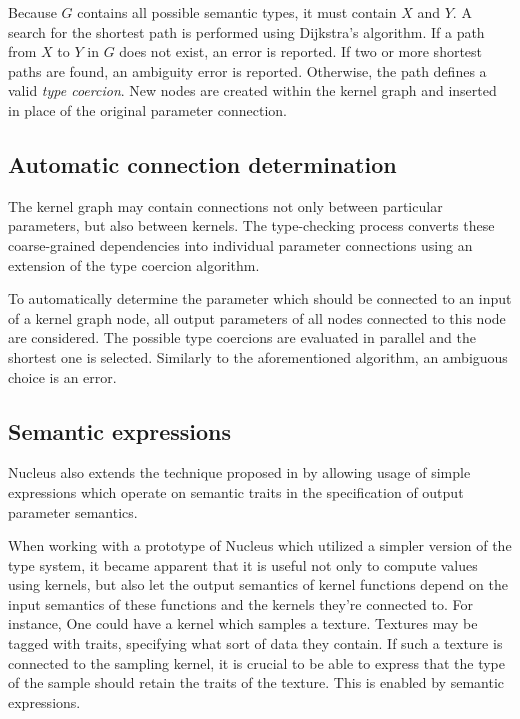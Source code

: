 Because $G$ contains all possible semantic types, it must contain $X$ and $Y$. A search for the shortest path is performed using Dijkstra's algorithm. If a path from $X$ to $Y$ in $G$ does not exist, an error is reported. If two or more shortest paths are found, an ambiguity error is reported. Otherwise, the path defines a valid \emph{type coercion}. New nodes are created within the kernel graph and inserted in place of the original parameter connection.

	
\subsection{Automatic connection determination}

The kernel graph may contain connections not only between particular parameters, but also between kernels. The type-checking process converts these coarse-grained dependencies into individual parameter connections using an extension of the type coercion algorithm.

To automatically determine the parameter which should be connected to an input of a kernel graph node, all output parameters of all nodes connected to this node are considered. The possible type coercions are evaluated in parallel and the shortest one is selected. Similarly to the aforementioned algorithm, an ambiguous choice is an error.


\subsection{Semantic expressions}

Nucleus also extends the technique proposed in \cite{mcguire2006shadetrees} by allowing usage of simple expressions which operate on semantic traits in the specification of output parameter semantics.

When working with a prototype of Nucleus which utilized a simpler version of the type system, it became apparent that it is useful not only to compute values using kernels, but also let the output semantics of kernel functions depend on the input semantics of these functions and the kernels they're connected to. For instance, One could have a kernel which samples a texture. Textures may be tagged with traits, specifying what sort of data they contain. If such a texture is connected to the sampling kernel, it is crucial to be able to express that the type of the sample should retain the traits of the texture. This is enabled by semantic expressions.

